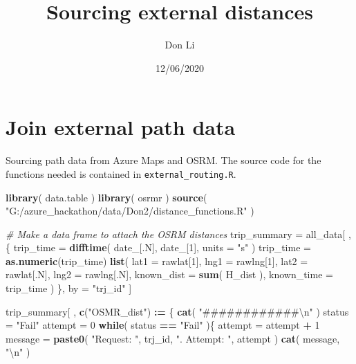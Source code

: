 \documentclass[]{article}
\title{Sourcing external distances}
\author{Don Li}
\date{12/06/2020}
\newenvironment{Shaded}{\begin{snugshade}}{\end{snugshade}}
\newcommand{\CharTok}[1]{\textcolor[rgb]{0.31,0.60,0.02}{#1}}
\newcommand{\CommentTok}[1]{\textcolor[rgb]{0.56,0.35,0.01}{\textit{#1}}}
\newcommand{\ControlFlowTok}[1]{\textcolor[rgb]{0.13,0.29,0.53}{\textbf{#1}}}
\newcommand{\DataTypeTok}[1]{\textcolor[rgb]{0.13,0.29,0.53}{#1}}
\newcommand{\DecValTok}[1]{\textcolor[rgb]{0.00,0.00,0.81}{#1}}
\newcommand{\ErrorTok}[1]{\textcolor[rgb]{0.64,0.00,0.00}{\textbf{#1}}}
\newcommand{\KeywordTok}[1]{\textcolor[rgb]{0.13,0.29,0.53}{\textbf{#1}}}
\newcommand{\NormalTok}[1]{#1}
\newcommand{\OperatorTok}[1]{\textcolor[rgb]{0.81,0.36,0.00}{\textbf{#1}}}
\newcommand{\StringTok}[1]{\textcolor[rgb]{0.31,0.60,0.02}{#1}}
\begin{document}
\maketitle

\hypertarget{join-external-path-data}{%
\section{Join external path data}\label{join-external-path-data}}

Sourcing path data from Azure Maps and OSRM. The source code for the
functions needed is contained in \texttt{external\_routing.R}.

\begin{Shaded}
\begin{Highlighting}[]
\KeywordTok{library}\NormalTok{( data.table )}
\KeywordTok{library}\NormalTok{( osrmr )}
\KeywordTok{source}\NormalTok{( }\StringTok{"G:/azure_hackathon/data/Don2/distance_functions.R"}\NormalTok{ )}

\CommentTok{# Make a data frame to attach the OSRM distances}
\NormalTok{trip_summary =}\StringTok{ }\NormalTok{all_data[ , \{}
\NormalTok{    trip_time =}\StringTok{ }\KeywordTok{difftime}\NormalTok{( date_[.N], date_[}\DecValTok{1}\NormalTok{], }\DataTypeTok{units =} \StringTok{"s"}\NormalTok{ )}
\NormalTok{    trip_time =}\StringTok{ }\KeywordTok{as.numeric}\NormalTok{(trip_time)}
    \KeywordTok{list}\NormalTok{(}
        \DataTypeTok{lat1 =}\NormalTok{ rawlat[}\DecValTok{1}\NormalTok{], }\DataTypeTok{lng1 =}\NormalTok{ rawlng[}\DecValTok{1}\NormalTok{],}
        \DataTypeTok{lat2 =}\NormalTok{ rawlat[.N], }\DataTypeTok{lng2 =}\NormalTok{ rawlng[.N],}
        \DataTypeTok{known_dist =} \KeywordTok{sum}\NormalTok{( H_dist ),}
        \DataTypeTok{known_time =}\NormalTok{ trip_time}
\NormalTok{    )}
\NormalTok{\}, by =}\StringTok{ "trj_id"}\NormalTok{ ]}

\NormalTok{trip_summary[ , }\KeywordTok{c}\NormalTok{(}\StringTok{"OSMR_dist"}\NormalTok{) }\OperatorTok{:}\ErrorTok{=}\StringTok{ }\NormalTok{\{}
    \KeywordTok{cat}\NormalTok{( }\StringTok{"############}\CharTok{\textbackslash{}n}\StringTok{"}\NormalTok{ )}
\NormalTok{    status =}\StringTok{ "Fail"}
\NormalTok{    attempt =}\StringTok{ }\DecValTok{0}
    \ControlFlowTok{while}\NormalTok{( status }\OperatorTok{==}\StringTok{ "Fail"}\NormalTok{ )\{}
\NormalTok{        attempt =}\StringTok{ }\NormalTok{attempt }\OperatorTok{+}\StringTok{ }\DecValTok{1}
\NormalTok{        message =}\StringTok{ }\KeywordTok{paste0}\NormalTok{( }\StringTok{"Request: "}\NormalTok{, trj_id, }
            \StringTok{". Attempt: "}\NormalTok{, attempt )}
        \KeywordTok{cat}\NormalTok{( message, }\StringTok{"}\CharTok{\textbackslash{}n}\StringTok{"}\NormalTok{ )}


\end{Highlighting}
\end{Shaded}
\end{document}
